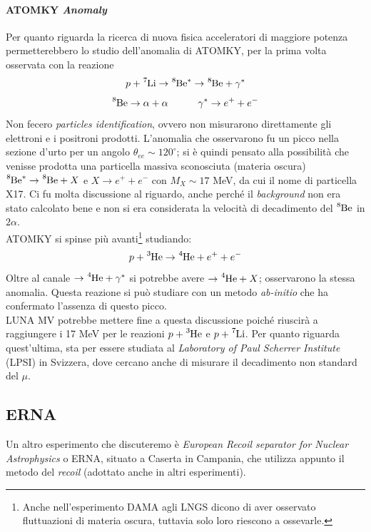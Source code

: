 \paragraph{ATOMKY \textit{Anomaly}} Per quanto riguarda la ricerca di nuova fisica acceleratori di maggiore potenza permetterebbero lo studio dell'anomalia di ATOMKY, per la prima volta osservata con la reazione
$$p+ \ce{^7Li} \to \ce{^8Be}^* \to \ce{^8Be} + \gamma^* $$
$$\ce{^8Be}\to \alpha + \alpha \qquad\quad \gamma^* \to e^+ + e^-$$
Non fecero \textit{particles identification}, ovvero non misurarono direttamente gli elettroni e i positroni prodotti. L'anomalia che osservarono fu un picco nella sezione d'urto per un angolo $\theta_{ee} \sim 120^{\circ}$; si è quindi pensato alla possibilità che venisse prodotta una particella massiva sconosciuta (materia oscura) $\ce{^8Be}^* \to \ce{^8Be} + X$ e $X\to e^+ + e^- $ con $M_X\sim 17$ MeV, da cui il nome di particella X17.
Ci fu molta discussione al riguardo, anche perché il \textit{background} non era stato calcolato bene e non si era considerata la velocità di decadimento del $\ce{^8Be}$ in $2\alpha$.\\
ATOMKY si spinse più avanti\footnote{Anche nell'esperimento DAMA agli LNGS dicono di aver osservato fluttuazioni di materia oscura, tuttavia solo loro riescono a ossevarle.} studiando:
$$p+\ce{^3He} \to \ce{^4He}+e^++e^-$$
Oltre al canale $\to \ce{^4He} +\gamma^*$ si potrebbe avere $\to \ce{^4He} + X$; osservarono la stessa anomalia. Questa reazione si può studiare con un metodo \textit{ab-initio} che ha confermato l'assenza di questo picco.\\
LUNA MV potrebbe mettere fine a questa discussione poiché riuscirà a raggiungere i 17 MeV per le reazioni $p+\ce{^3He}$ e $p+\ce{^7Li}$. Per quanto riguarda quest'ultima, sta per essere studiata al \textit{Laboratory of Paul Scherrer Institute} (LPSI) in Svizzera, dove cercano anche di misurare il decadimento non standard del $\mu$.

\subsection{ERNA}
Un altro esperimento che discuteremo è \textit{European Recoil separator for Nuclear Astrophysics} o ERNA, situato a Caserta in Campania, che utilizza appunto il metodo del \textit{recoil} (adottato anche in altri esperimenti).

